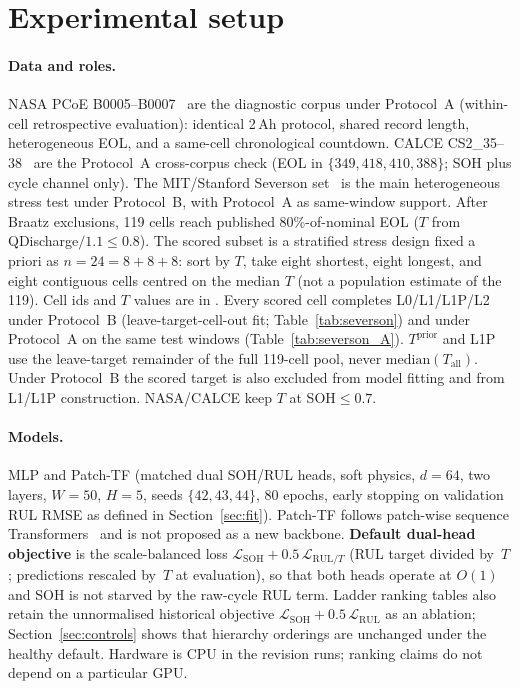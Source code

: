 \documentclass[preprint,12pt]{elsarticle}
\begin{document}
\section{Experimental setup}
\label{sec:setup}

\paragraph{Data and roles.}
NASA PCoE B0005--B0007~\cite{saha2007nasa} are the diagnostic corpus under Protocol~A (within-cell retrospective evaluation): identical 2\,Ah protocol, shared record length, heterogeneous EOL, and a same-cell chronological countdown.
CALCE CS2\_35--38~\cite{he2011calce} are the Protocol~A cross-corpus check (EOL in $\{349,418,410,388\}$; SOH plus cycle channel only).
The MIT/Stanford Severson set~\cite{severson2019nature} is the main heterogeneous stress test under Protocol~B, with Protocol~A as same-window support.
After Braatz exclusions, 119 cells reach published 80\%-of-nominal EOL ($T$ from QDischarge$/1.1\le 0.8$).
The scored subset is a stratified stress design fixed a priori as $n{=}24{=}8{+}8{+}8$: sort by $T$, take eight shortest, eight longest, and eight contiguous cells centred on the median $T$ (not a population estimate of the 119).
Cell ids and $T$ values are in .
Every scored cell completes L0/L1/L1P/L2 under Protocol~B (leave-target-cell-out fit; Table~\ref{tab:severson}) and under Protocol~A on the same test windows (Table~\ref{tab:severson_A}).
$T^{\mathrm{prior}}$ and L1P use the leave-target remainder of the full 119-cell pool, never $\mathrm{median}(T_{\mathrm{all}})$.
Under Protocol~B the scored target is also excluded from model fitting and from L1/L1P construction.
NASA/CALCE keep $T$ at SOH$\le 0.7$.

\paragraph{Models.}
MLP and Patch-TF (matched dual SOH/RUL heads, soft physics, $d{=}64$, two layers, $W{=}50$, $H{=}5$, seeds $\{42,43,44\}$, 80 epochs, early stopping on validation RUL RMSE as defined in Section~\ref{sec:fit}).
Patch-TF follows patch-wise sequence Transformers~\cite{vaswani2017,nie2023patchtst} and is not proposed as a new backbone.
\textbf{Default dual-head objective} is the scale-balanced loss
$\mathcal{L}_{\mathrm{SOH}}+0.5\,\mathcal{L}_{\mathrm{RUL}/T}$
(RUL target divided by~$T$; predictions rescaled by~$T$ at evaluation), so that both heads operate at $O(1)$ and SOH is not starved by the raw-cycle RUL term.
Ladder ranking tables also retain the unnormalised historical objective $\mathcal{L}_{\mathrm{SOH}}+0.5\,\mathcal{L}_{\mathrm{RUL}}$ as an ablation; Section~\ref{sec:controls} shows that hierarchy orderings are unchanged under the healthy default.
Hardware is CPU in the revision runs; ranking claims do not depend on a particular GPU.
\end{document}
